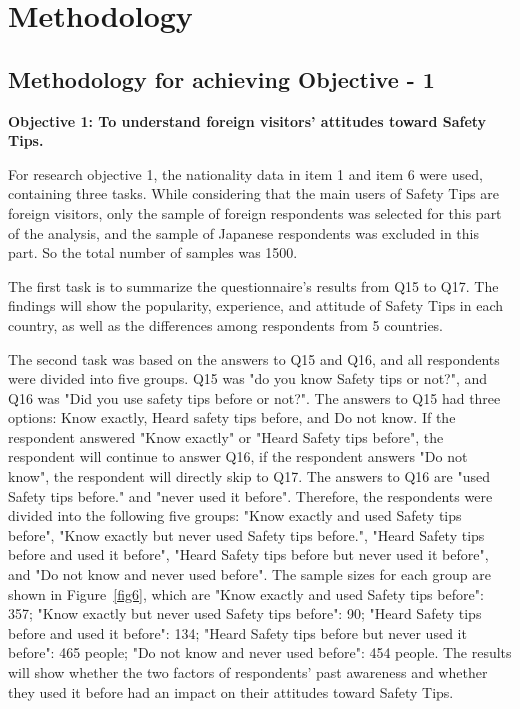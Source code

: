 


\chapter{Methodology }

\section{Methodology for achieving Objective - 1 }

\textbf{Objective 1: To understand foreign visitors' attitudes toward Safety Tips.}

For research objective 1, the nationality data in item 1 and item 6 were used, containing three tasks. While considering that the main users of Safety Tips are foreign visitors, only the sample of foreign respondents was selected for this part of the analysis, and the sample of Japanese respondents was excluded in this part. So the total number of samples was 1500.

The first task is to summarize the questionnaire's results from Q15 to Q17. The findings will show the popularity, experience, and attitude of Safety Tips in each country, as well as the differences among respondents from 5 countries.

The second task was based on the answers to Q15 and Q16, and all respondents were divided into five groups. Q15 was "do you know Safety tips or not?", and Q16 was "Did you use safety tips before or not?". The answers to Q15 had three options: Know exactly, Heard safety tips before, and Do not know. If the respondent answered "Know exactly" or "Heard Safety tips before", the respondent will continue to answer Q16, if the respondent answers "Do not know", the respondent will directly skip to Q17. The answers to Q16 are "used Safety tips before." and "never used it before". Therefore, the respondents were divided into the following five groups: "Know exactly and used Safety tips before", "Know exactly but never used Safety tips before.", "Heard Safety tips before and used it before", "Heard Safety tips before but never used it before", and "Do not know and never used before". The sample sizes for each group are shown in Figure~\ref{fig6}, which are "Know exactly and used Safety tips before": 357; "Know exactly but never used Safety tips before": 90; "Heard Safety tips before and used it before": 134; "Heard Safety tips before but never used it before": 465 people; "Do not know and never used before": 454 people. The results will show whether the two factors of respondents' past awareness and whether they used it before had an impact on their attitudes toward Safety Tips.


